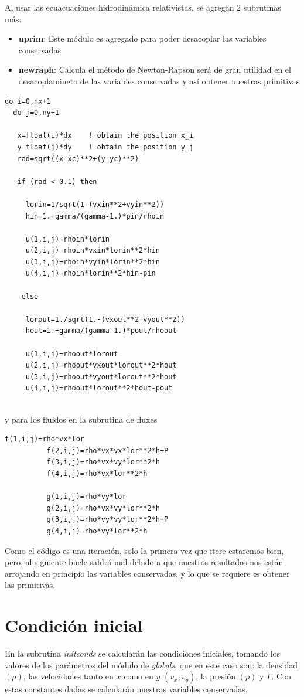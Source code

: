 \documentclass[12pt,a4paper]{book}
\begin{document}
Al usar las ecuacuaciones hidrodinámica relativistas, se agregan 2 subrutinas más:

\begin{itemize}
\item \textbf{uprim}: Este módulo es agregado para poder desacoplar las variables conservadas

\item \textbf{newraph}: Calcula el método de Newton-Rapson será de gran utilidad en el desacoplamineto de las variables conservadas y así obtener nuestras primitivas
\end{itemize}

\begin{lstlisting}[frame=single] 
do i=0,nx+1
  do j=0,ny+1
   
   x=float(i)*dx 	! obtain the position x_i
   y=float(j)*dy 	! obtain the position y_j
   rad=sqrt((x-xc)**2+(y-yc)**2)
   
   if (rad < 0.1) then
   
     lorin=1/sqrt(1-(vxin**2+vyin**2))
     hin=1.+gamma/(gamma-1.)*pin/rhoin
           
     u(1,i,j)=rhoin*lorin
     u(2,i,j)=rhoin*vxin*lorin**2*hin
     u(3,i,j)=rhoin*vyin*lorin**2*hin
     u(4,i,j)=rhoin*lorin**2*hin-pin
    
    else
    
     lorout=1./sqrt(1.-(vxout**2+vyout**2))
     hout=1.+gamma/(gamma-1.)*pout/rhoout
     
     u(1,i,j)=rhoout*lorout
     u(2,i,j)=rhoout*vxout*lorout**2*hout
     u(3,i,j)=rhoout*vyout*lorout**2*hout
     u(4,i,j)=rhoout*lorout**2*hout-pout
     

\end{lstlisting}
y para los fluidos en la subrutina de fluxes
\begin{lstlisting}[frame=single]
          f(1,i,j)=rho*vx*lor
          f(2,i,j)=rho*vx*vx*lor**2*h+P
          f(3,i,j)=rho*vx*vy*lor**2*h
          f(4,i,j)=rho*vx*lor**2*h

          g(1,i,j)=rho*vy*lor
          g(2,i,j)=rho*vx*vy*lor**2*h
          g(3,i,j)=rho*vy*vy*lor**2*h+P
          g(4,i,j)=rho*vy*lor**2*h
\end{lstlisting}
Como el código es una iteración, solo la primera vez que itere estaremos bien, pero, al siguiente bucle saldrá mal debido a que nuestros resultados nos están arrojando en principio las variables conservadas, y lo que se requiere es obtener las primitivas.

\section{Condición inicial}
En la subrutína \textit{initconds} se calcularán las condiciones iniciales, tomando los valores de los parámetros del módulo de \textit{globals}, que en este caso son: la densidad $(\rho)$, las velocidades tanto en $x$ como en $y$ $(v_x, v_y)$, la presión $(p)$ y $\Gamma$. Con estas constantes dadas se calcularán nuestras variables conservadas.
\end{document}

